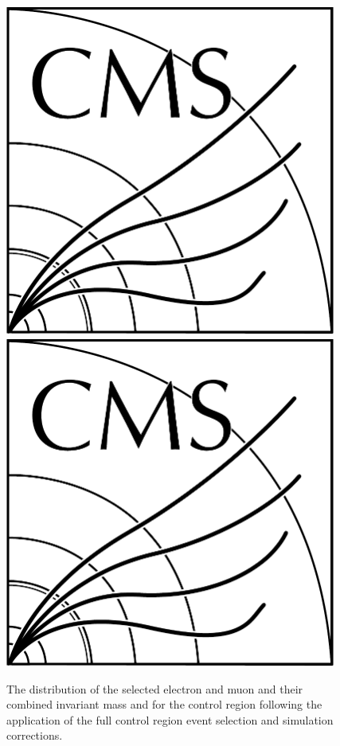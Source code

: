 \begin{figure}[htb]
\includegraphics[width=0.97\textwidth]{CMS-bw-logo.pdf}
\\
\includegraphics[width=0.97\textwidth]{CMS-bw-logo.pdf}
\caption{
The distribution of the selected electron and muon and their combined invariant mass and \pt for the \ttbar control region following the application of the full control region event selection and simulation corrections.
}
\label{fig:ttbarCR_leptons}
\end{figure}

